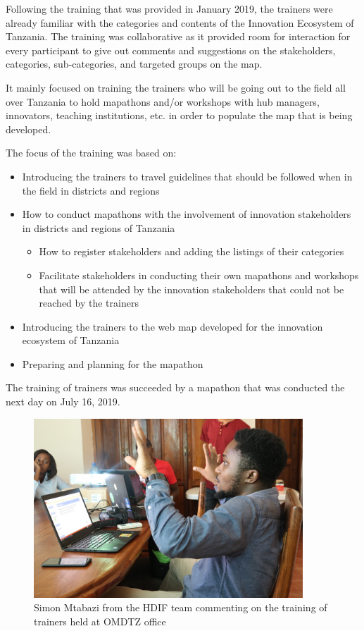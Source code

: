 \documentclass[a4paper,12pt,twoside]{article}
\begin{document}
Following the training that was provided in January 2019, the trainers were already familiar with the categories and contents of the Innovation Ecosystem of Tanzania. The training was collaborative as it provided room for interaction for every participant to give out comments and suggestions on the stakeholders, categories, sub-categories, and targeted groups on the map.  

It mainly focused on training the trainers who will be going out to the field all over Tanzania to hold mapathons and/or workshops with hub managers, innovators, teaching institutions, etc. in order to populate the map that is being developed.


The focus of the training was based on:

\begin{itemize}
	\item Introducing the trainers to travel guidelines that should be followed when in the field in districts and regions
	\item How to conduct mapathons with the involvement of innovation stakeholders in districts and regions of Tanzania
	\begin{itemize}
		\item How to register stakeholders and adding the listings of their categories
		\item Facilitate stakeholders in conducting their own mapathons and workshops that will be attended by the innovation stakeholders that could not be reached by the trainers
	\end{itemize}
	\item Introducing the trainers to the web map developed for the innovation ecosystem of Tanzania
	\item Preparing and planning for the mapathon
\end{itemize}

The training of trainers was succeeded by a mapathon that was conducted the next day on July 16, 2019.

\begin{figure}[H] %
	\centering
	\includegraphics[width=0.9\textwidth]{images/Simon_training.JPG}
	\caption{Simon Mtabazi from the HDIF team commenting on the training of trainers held at OMDTZ office}
\end{figure}
\end{document}
